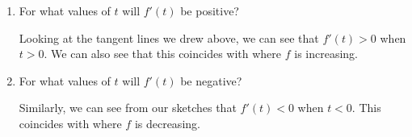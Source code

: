 \documentclass{article}
\begin{document}
\begin{enumerate}
\begin{enumerate}
\begin{enumerate}
      \begin{solution}
        We can draw tangent lines at $x=-3$ and $x=-1$ and compare their slopes.
        \begin{center}
        \end{center}

        Both tangent lines have negative slopes, but the slope of the tangent line at $x=-1$ is less negative. Thus, 
        $f(-1) > f(-3)$. 
      \end{solution}

    \item


      \begin{problem}[\stretch{0.3}]
        For what values of $t$ will $f'(t)$ be positive?
      \end{problem}

      \begin{solution} 
        Looking at the tangent lines we drew above, we can see that
            $f'(t)>0 $ when $t>0$. 
        We can also see that this coincides with where $f$ is increasing.
      \end{solution}

    \item
      \begin{problem}[\stretch{0.3}]
        For what values of $t$ will $f'(t)$ be negative?
      \end{problem}

      \begin{solution} 
        Similarly, we can see from our sketches that
            $f'(t)<0 $ when $t<0$.
        This coincides with where $f$ is decreasing. 
      \end{solution}


\end{enumerate}
\end{enumerate}
\end{enumerate}
\end{document}
